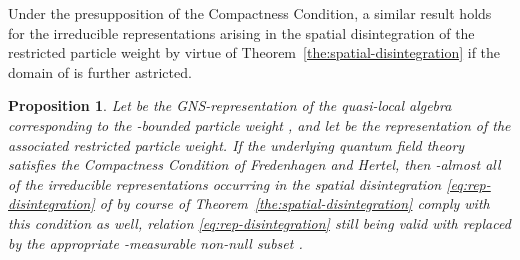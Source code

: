 \documentclass[a4paper,a4paper]{article}
\numberwithin{equation}{section}
\providecommand{\Xecm}{\mathecm{X}}
\providecommand{\Afrak}{\mathfrak{A}}
\providecommand{\Hscr}{\mathscr{H}}
\providecommand{\Hbullet}{\mathscr{H}^\bullet}
\theoremstyle{definition}
\theoremstyle{plain}
\newtheorem{proposition}[definition]{Proposition}
\theoremstyle{remark}
\theoremstyle{assumption}
\providecommand{\scp}[2]{\langle #1 \vert #2 \rangle}
\begin{document}
  Under the presupposition of the Compactness Condition, a similar
  result holds for the irreducible representations \myHighlight{$( \pi_\xi ,
  \Hscr_\xi )$}\coordHE{} arising in the spatial disintegration of the restricted
  particle weight by virtue of
  Theorem~\ref{the:spatial-disintegration} if the domain of \myHighlight{$\xi$}\coordHE{} is
  further astricted.
  \begin{proposition}
    \label{pro:xi-precompactness}
    Let \myHighlight{$( \pi_w , \Hscr_w )$}\coordHE{} be the GNS-representation of the
    quasi-local algebra \myHighlight{$\Afrak$}\coordHE{} corresponding to the \myHighlight{$\Delta$}\coordHE{}-bounded
    particle weight \myHighlight{$\scp{~.~}{~.~}$}\coordHE{}, and let \myHighlight{$( \pi^\bullet ,
    \Hbullet )$}\coordHE{} be the representation of the associated restricted
    particle weight. If the underlying quantum field theory satisfies
    the Compactness Condition of Fredenhagen and Hertel, then
    \myHighlight{$\nu$}\coordHE{}-almost all of the irreducible representations \myHighlight{$( \pi_\xi ,
    \Hscr_\xi )$}\coordHE{} occurring in the spatial disintegration
    \eqref{eq:rep-disintegration} of \myHighlight{$( \pi^\bullet , \Hbullet )$}\coordHE{} by
    course of Theorem~\ref{the:spatial-disintegration} comply with
    this condition as well, relation \eqref{eq:rep-disintegration}
    still being valid with \myHighlight{$\Xecm$}\coordHE{} replaced by the appropriate
    \myHighlight{$\nu$}\coordHE{}-measurable non-null subset \myHighlight{$\Xecm_0$}\coordHE{}.
  \end{proposition}
  
\end{document}
